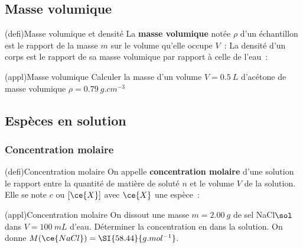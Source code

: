 \documentclass[../../main/main.tex]{subfiles}
\begin{document}
\subsection{Masse volumique}
\begin{tcb}[label=defi:massevol, sidebyside,
		righthand ratio=.4](defi){Masse volumique et densité}
	La \textbf{masse volumique} notée $\rho$ d'un échantillon est le rapport
	de la masse $m$ sur le volume qu'elle occupe $V$~:
	\psw{
		\[
			\boxed{\rho = \frac{m}{V}}
			\qen
			\si{kg.m^{-3}}
			\qou
			\si{g.L^{-1}}
			\qou
			\si{g.cm^{-3}}
		\]
	}
	\tcblower
	La densité d'un corps est le rapport de sa masse volumique par rapport à
	celle de l'eau~:
	\psw{
		\[
			\boxed{d = \frac{\rho}{\rho_{\eau}}}
			\qav
			\rho_{\eau} = \SI{1.0}{kg.L^{-1}}
		\]
	}
\end{tcb}
\begin{tcb}[label=exem:massvol](appl){Masse volumique}
	Calculer la masse d'un volume $V = \SI{0.5}{L}$ d'acétone de masse volumique
	$\rho = \SI{0.79}{g.cm^{-3}}$
	\tcblower
\end{tcb}

\vspace{-15pt}
\subsection{Espèces en solution}
\subsubsection{Concentration molaire}

\begin{tcb}[label=def:cmol](defi){Concentration molaire}
	On appelle \textbf{concentration molaire} d'une solution le
	rapport entre la quantité de matière de soluté $n$ et le volume $V$ de
	la solution. Elle se note $c$ ou $[\ce{X}]$ avec $\ce{X}$ une espèce~:
	\psw{
		\[
			\boxed{c = \frac{n}{V}}
			\qen
			\si{mol.L^{-1}}
		\]
	}
\end{tcb}
\begin{tcb}[label=exem:cmol, breakable](appl){Concentration molaire}
	On dissout une masse $m = \SI{2.00}{g}$ de sel NaCl$\sol$ dans $V =
		\SI{100}{mL}$ d'eau.
	\smallbreak
	Déterminer la concentration en  dans la solution.
	\smallbreak
	On donne $M(\ce{NaCl}) = \SI{58.44}{g.mol^{-1}}$.
	\tcblower
\end{tcb}
\end{document}
